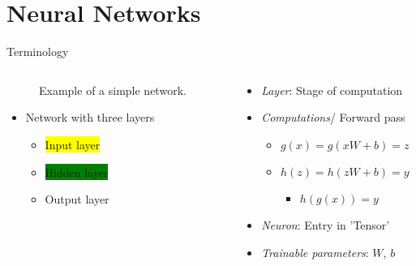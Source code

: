 \documentclass[usenames,dvipsnames,Nike,mathserif]{tuberlinbeamer}
\begin{document}
\section{Neural Networks}
\begin{frame}[fragile]{Terminology}
	\begin{columns}
		\begin{column}{.5\textwidth}
			\begin{figure}
				
				\caption{Example of a simple network.}
			\end{figure}
			\begin{itemize}
				\item<1-> Network with three layers
				\begin{itemize}
					\item<2->\colorbox{yellow}{Input layer}
					\item<2-> \colorbox{green}{Hidden layer}
					\item<2-> \colorbox{BlueGreen}{Output layer}
				\end{itemize}
			\end{itemize}
		\end{column}
		\begin{column}{.5\textwidth}
			\begin{itemize}
				\item<3->\emph{Layer}: Stage of computation
				\item<4->\emph{Computations}/ Forward pass
					\begin{itemize}
						\item $g(x)=g(xW+b)=z$
						\item $h(z)=h(zW+b)=y$
						 \begin{itemize}
						 	\item $h(g(x))=y$
						 \end{itemize}
					\end{itemize}
				\item<5->\emph{Neuron}: Entry in 'Tensor'
				\item<6->\emph{Trainable parameters}: $W$, $b$
			\end{itemize}
		\end{column}
	\end{columns}
\end{frame}
\end{document}
